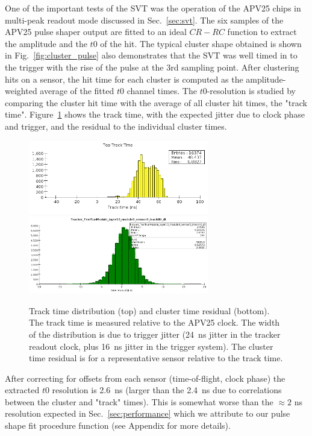 One of the important tests of the SVT was the operation of the APV25 chips in multi-peak readout mode 
discussed in Sec.~\ref{sec:svt}. The six samples of the APV25 pulse shaper output 
are fitted to an ideal $CR-RC$ function to extract the amplitude and the $t0$ of the hit. 
The typical cluster shape obtained is shown in Fig.~\ref{fig:cluster_pulse} also demonstrates that the SVT was well timed in to the trigger with the rise of the pulse at the 3rd sampling point.
After clustering hits on a sensor, the hit time for each cluster is computed as the amplitude-weighted average of 
the fitted $t0$ channel times. The $t0$-resolution is studied by comparing the cluster hit time with the average of all cluster hit times, the "track time". Figure~\ref{fig:tracktime} shows the track time, with the expected jitter due to clock phase and trigger, and the residual to the individual cluster times. 
\begin{figure}[h]
	\includegraphics[width=0.7\textwidth]{test2012/svtperformance/track_time_top}
	\includegraphics[width=0.7\textwidth]{test2012/svtperformance/timeres}
	\caption{\small{Track time distribution (top) and cluster time residual (bottom). The 
	track time is measured relative to the APV25 clock. The width of the distribution is due to 
	trigger jitter (24~ns jitter in the tracker readout clock, plus 16~ns jitter in the trigger system). 
	The cluster time residual is for a representative sensor relative to the track time.}}
	\label{fig:tracktime}
\end{figure}
After correcting for offsets from each sensor (time-of-flight, clock phase) the extracted $t0$ resolution is 2.6~ns (larger than the 2.4~ns due to correlations between the cluster and "track" times). This is somewhat worse than the $\approx 2$ ns resolution expected in Sec.~\ref{sec:performance} which we attribute to our pulse shape fit procedure function (see Appendix for more details). 

